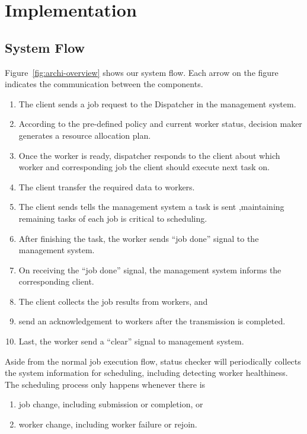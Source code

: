\chapter{Implementation}\label{chap:impl}  %

\section{System Flow}	%

Figure~\ref{fig:archi-overview} shows our system flow. Each arrow on the
figure indicates the communication between the components.
\begin{enumerate}
  \item The client sends a job request to the Dispatcher in the management 
    system.
  \item According to the pre-defined policy and current worker status,
    decision maker generates a resource allocation plan.
  \item Once the worker is ready, dispatcher responds to the client
    about which worker and corresponding job the client should execute
    next task on.
  \item The client transfer the required data to workers.
  \item The client sends tells the management system a task is sent
    ,maintaining remaining tasks of each job is critical to scheduling.
  \item After finishing the task, the worker sends ``job done'' signal
    to the management system.

  \item On receiving the ``job done'' signal, the management system
    informs the corresponding client.
  
  \item The client collects the job results from workers, and

  \item send an acknowledgement to workers after the transmission is
    completed.
  \item Last, the worker send a ``clear'' signal to management system.
\end{enumerate}
Aside from the normal job execution flow, status checker will
periodically collects the system information for scheduling, including
detecting worker healthiness.
The scheduling process only happens whenever there is 
\begin{enumerate}
  \item job change, including submission or completion, or
  \item worker change, including worker failure or rejoin.
\end{enumerate}

